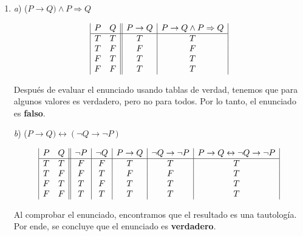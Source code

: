 \documentclass[11pt,a4paper]{article}
\begin{document}
\begin{enumerate}
\item 



\textit{a}) ($P\rightarrow Q) \wedge P \Rightarrow Q$


\begin{displaymath}
\begin{array}{|c c||c|c|}
P & Q & P \rightarrow Q & P\rightarrow Q \wedge P \Rightarrow Q \\ %
\hline %
T & T & T & T\\
T & F & F & F\\
F & T & T & T\\
F & F & T & T\\
\end{array}
\end{displaymath}

\vspace{0.2cm}

\noindent Después de evaluar el enunciado usando tablas de verdad, tenemos que para algunos valores es verdadero, pero no para todos. Por lo tanto, el enunciado es \textbf{falso}. 
\vspace{0.5cm}

\textit{b}) ($P\rightarrow Q) \leftrightarrow (\neg  Q \rightarrow \neg P)$

\begin{displaymath}
\begin{array}{|c c||c|c|c|c|c|}
P & Q & \neg  P & \neg  Q & P\rightarrow Q & \neg  Q \rightarrow \neg P & P\rightarrow Q \leftrightarrow \neg  Q \rightarrow \neg P \\
\hline
T & T & F & F & T & T & T\\
T & F & F & T & F & F & T\\
F & T & T & F & T & T & T\\
F & F & T & T & T & T & T\\
\end{array}
\end{displaymath}

\noindent Al comprobar el enunciado, encontramos que el resultado es una tautología. Por ende, se concluye que el enunciado es \textbf{verdadero}.


\end{enumerate}
\end{document}
